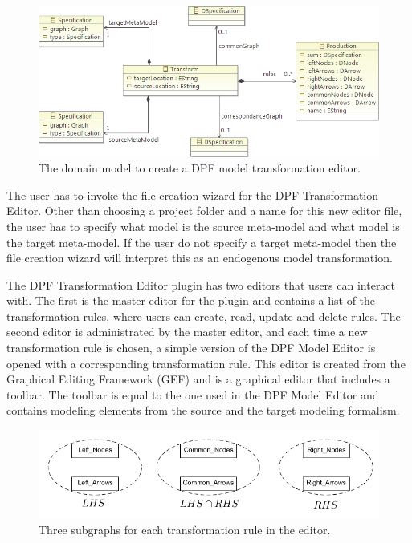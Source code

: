 \begin{figure}[H]
	\centering
	\includegraphics[scale=0.8]{./Figures/transform_metamodel_ecore.png}
	\caption[Model for the DPF Transformation Editor]
	{The domain model to create a DPF model transformation editor.}
	\label{fig:transform_metamodel}
\end{figure}

The user has to invoke the file creation wizard for the DPF Transformation Editor.
Other than choosing a project folder and a name for this new editor file, the
user has to specify what model is the source meta-model and what model is the
target meta-model. If the user do not specify a target meta-model then the file
creation wizard will interpret this as an endogenous model transformation.

The DPF Transformation Editor plugin has two editors that users can interact with.
The first is the master editor for the plugin and contains a list of the
transformation rules, where users can create, read, update and delete rules. The
second editor is administrated by the master editor, and each time a new
transformation rule is chosen, a simple version of the DPF Model Editor is
opened with a corresponding transformation rule. This editor is created from the 
Graphical Editing Framework (GEF) and is a graphical editor that includes a
toolbar. The toolbar is equal to the one used in  the DPF Model Editor and
contains modeling elements from the source and the target modeling formalism.

\begin{figure}[H]
	\centering
	\includegraphics[scale=0.7]{./Figures/left_common_right.png}
	\caption[The three subgraphs for a transformation rule.]
	{Three subgraphs for each transformation rule in the editor.}
	\label{fig:lists_editor}
\end{figure}


